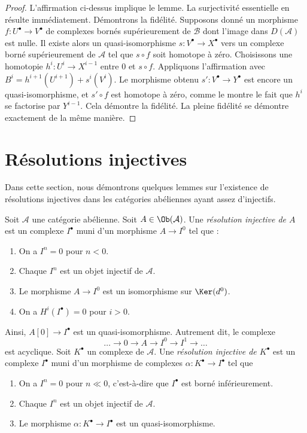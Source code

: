 \begin{proof}
\medskip\noindent
L'affirmation ci-dessus implique le lemme. La surjectivité essentielle en
résulte immédiatement. Démontrons la fidélité. Supposons donné un morphisme
$f : U^\bullet \to V^\bullet$ de complexes bornés supérieurement de
$\mathcal{B}$ dont l'image dans $D(\mathcal{A})$ est nulle. Il existe alors un
quasi-isomorphisme $s : V^\bullet \to X^\bullet$ vers un complexe borné
supérieurement de $\mathcal{A}$ tel que $s \circ f$ soit homotope à zéro.
Choisissons une homotopie $h^i : U^i \to X^{i - 1}$ entre $0$ et
$s \circ f$. Appliquons l'affirmation avec
$B^i = h^{i + 1}(U^{i + 1}) + s^i(V^i)$. Le morphisme obtenu
$s' : V^\bullet \to Y^\bullet$ est encore un quasi-isomorphisme, et
$s' \circ f$ est homotope à zéro, comme le montre le fait que $h^i$ se
factorise par $Y^{i - 1}$. Cela démontre la fidélité. La pleine fidélité se démontre
exactement de la même manière.
\end{proof}

\section{Résolutions injectives}
\label{section-injective-resolutions}

\noindent
Dans cette section, nous démontrons quelques lemmes sur l'existence de
résolutions injectives dans les catégories abéliennes ayant assez d'injectifs.

\begin{definition}
\label{definition-injective-resolution}
Soit $\mathcal{A}$ une catégorie abélienne. Soit
$A \in \Ob(\mathcal{A})$. Une {\it résolution injective de $A$} est un
complexe $I^\bullet$ muni d'un morphisme $A \to I^0$ tel que :
\begin{enumerate}
\item On a $I^n = 0$ pour $n < 0$.
\item Chaque $I^n$ est un objet injectif de $\mathcal{A}$.
\item Le morphisme $A \to I^0$ est un isomorphisme sur $\Ker(d^0)$.
\item On a $H^i(I^\bullet) = 0$ pour $i > 0$.
\end{enumerate}
Ainsi, $A[0] \to I^\bullet$ est un quasi-isomorphisme. Autrement dit, le
complexe
$$
\ldots \to 0 \to A \to I^0 \to I^1 \to \ldots
$$
est acyclique. Soit $K^\bullet$ un complexe de $\mathcal{A}$. Une
{\it résolution injective de $K^\bullet$} est un complexe $I^\bullet$ muni
d'un morphisme de complexes $\alpha : K^\bullet \to I^\bullet$ tel que
\begin{enumerate}
\item On a $I^n = 0$ pour $n \ll 0$, c'est-à-dire que $I^\bullet$ est borné
inférieurement.
\item Chaque $I^n$ est un objet injectif de $\mathcal{A}$.
\item Le morphisme $\alpha : K^\bullet \to I^\bullet$ est un
quasi-isomorphisme.
\end{enumerate}
\end{definition}


